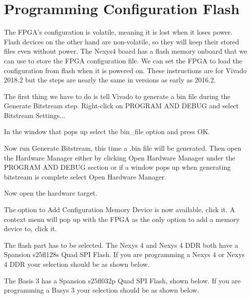 \documentclass[letterpaper]{article}
\begin{document}
\section*{Programming Configuration Flash}
The FPGA's configuration is volatile, meaning it is lost when it loses power.
Flash devices on the other hand are non-volatile, so they will keep their stored files even
without power.
The Nexys4 board has a flash memory onboard that we can use to store the FPGA configuration file.
We can set the FPGA to load the configuration from flash when it is powered on.
These instructions are for Vivado 2018.2 but the steps are nearly the same in versions as
early as 2016.2.

The first thing we have to do is tell Vivado to generate a bin file during the Generate
Bitstream step. Right-click on PROGRAM AND DEBUG and select Bitstream Settings...


In the window that pops up select the bin\_file option and press OK.


Now run Generate Bitstream, this time a .bin file will be generated.
Then open the Hardware Manager either by clicking Open Hardware Manager under the PROGRAM
AND DEBUG section or if a window pops up when generating bitstream is complete select Open
Hardware Manager.


Now open the hardware target.


The option to Add Configuration Memory Device is now available, click it.
A context menu will pop up with the FPGA as the only option to add a memory device to, click it.


The flash part has to be selected.
The Nexys 4 and Nexys 4 DDR both have a Spansion s25fl128s Quad SPI Flash.
If you are programming a Nexys 4 or Nexys 4 DDR your selection should be as shown below.


The Basis 3 has a Spansion s25fl032p Quad SPI Flash, shown below.
If you are programming a Basys 3 your selection should be as shown below.
\end{document}
